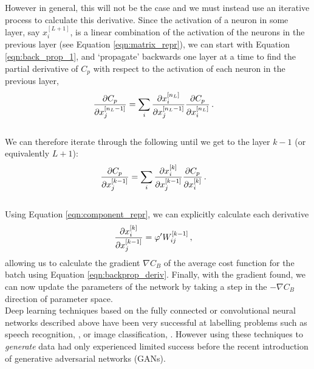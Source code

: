 \documentclass[11pt,a4paper,onecolumn]{report}
\begin{document}
However in general, this will not be the case and we must instead use an
iterative process to calculate this derivative. Since the activation of a neuron
in some layer, say \(x_i^{[L+1]}\), is a linear combination of the activation of
the neurons in the previous layer (see Equation \ref{eqn:matrix_repr}), we can
start with Equation \ref{eqn:back_prop_1}, and `propagate' backwards one layer
at a time to find the partial derivative of \(C_p\) with respect to the
activation of each neuron in the previous layer,
\begin{align}
  \partialderivative{C_p}{x_j^{[n_L - 1]}}
  &= \sum\limits_i \partialderivative{x_i^{[n_L]}}{x_j^{[n_L - 1]}}
  \partialderivative{C_p}{x_i^{[n_L]}} \,.
  \label{eqn:back_prop_2}
\end{align}
\\

\noindent We can therefore iterate through the following until we get to the layer
\(k-1\) (or equivalently \(L+1\)):
\begin{align}
  \partialderivative{C_p}{x_j^{[k - 1]}}
  &= \sum\limits_i \partialderivative{x_i^{[k]}}{x_j^{[k - 1]}}
  \partialderivative{C_p}{x_i^{[k]}}\,.
  \label{eqn:back_prop_3}
\end{align}
\\

\noindent Using Equation \ref{eqn:component_repr}, we can explicitly calculate each derivative
\begin{align}
  \partialderivative{x_i^{[k]}}{x_j^{[k - 1]}}
  &= \varphi'W_{ij}^{[k-1]}\,,
\end{align}
allowing us to calculate the gradient \(\nabla C_B\) of the average cost
function for the batch using Equation \ref{eqn:backprop_deriv}. Finally, with
the gradient found, we can now update the parameters of the network by taking a
step in the \(-\nabla C_B\) direction of parameter space. \\

Deep learning techniques based on the fully connected or convolutional neural
networks described above have been very successful at labelling problems such as
speech recognition, \citep{Hinton2012}, or image classification,
\citep{Krizhevsky2012}. However using these techniques to \textit{generate}
data had only experienced limited success before the recent introduction of
generative adversarial networks (GANs).\\
\end{document}
